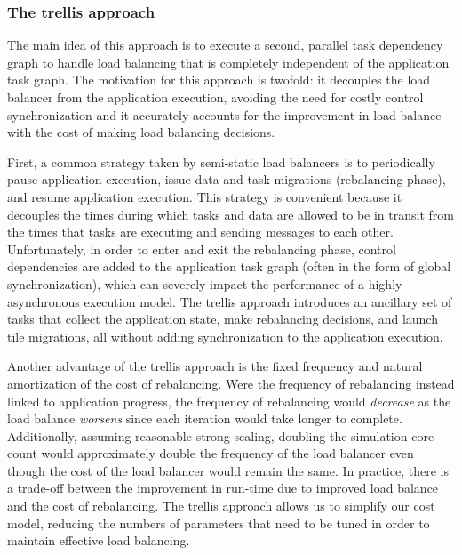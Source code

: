 \subsubsection{The trellis approach}
The main idea of this approach is to execute a second, parallel task dependency graph to handle load balancing that is completely independent of the application task graph.
The motivation for this approach is twofold: it decouples the load balancer from the application execution, avoiding the need for costly control synchronization and it accurately accounts for the improvement in load balance with the cost of making load balancing decisions.

First, a common strategy taken by semi-static load balancers is to periodically pause application execution, issue data and task migrations (rebalancing phase), and resume application execution.
This strategy is convenient because it decouples the times during which tasks and data are allowed to be in transit from the times that tasks are executing and sending messages to each other.
Unfortunately, in order to enter and exit the rebalancing phase, control dependencies are added to the application task graph (often in the form of global synchronization), which can severely impact the performance of a highly asynchronous execution model.
The trellis approach introduces an ancillary set of tasks that collect the application state, make rebalancing decisions, and launch tile migrations, all without adding synchronization to the application execution.

Another advantage of the trellis approach is the fixed frequency and natural amortization of the cost of rebalancing.
Were the frequency of rebalancing instead linked to application progress, the frequency of rebalancing would {\em decrease} as the load balance {\em worsens} since each iteration would take longer to complete.
Additionally, assuming reasonable strong scaling, doubling the simulation core count would approximately double the frequency of the load balancer even though the cost of the load balancer would remain the same.
In practice, there is a trade-off between the improvement in run-time due to improved load balance and the cost of rebalancing.
The trellis approach allows us to simplify our cost model,
reducing the numbers of parameters that need to be tuned in order to maintain effective load balancing.

